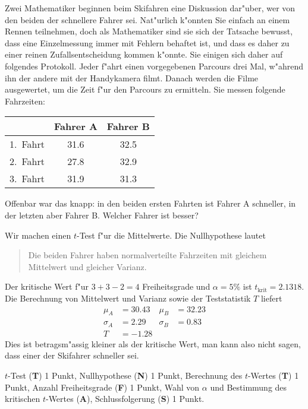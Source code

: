 Zwei Mathematiker beginnen beim Skifahren eine Diskussion dar"uber, 
wer von den beiden der schnellere Fahrer sei.
Nat"urlich k"onnten Sie einfach an einem Rennen teilnehmen, doch
als Mathematiker sind sie sich der Tatsache bewusst, dass eine
Einzelmessung immer mit Fehlern behaftet ist, und dass es daher
zu einer reinen Zufallsentscheidung kommen k"onnte. Sie einigen sich daher
auf folgendes Protokoll. Jeder f"ahrt einen vorgegebenen Parcours
drei Mal, w"ahrend ihn der andere mit der Handykamera filmt.
Danach werden die Filme ausgewertet, um die Zeit f"ur den Parcours
zu ermitteln. Sie messen folgende Fahrzeiten:
\begin{center}
\begin{tabular}{|l|c|c|}
\hline
        &Fahrer A&Fahrer B\\
\hline
1.~Fahrt&  31.6  &  32.5  \\
2.~Fahrt&  27.8  &  32.9  \\
3.~Fahrt&  31.9  &  31.3  \\
\hline
\end{tabular}
\end{center}
Offenbar war das knapp: in den beiden ersten Fahrten ist Fahrer A schneller,
in der letzten aber Fahrer B.
Welcher Fahrer ist besser?

\begin{loesung}
Wir machen einen $t$-Test f"ur die Mittelwerte.
Die Nullhypothese lautet
\begin{quote}
Die beiden Fahrer haben normalverteilte Fahrzeiten mit gleichem
Mittelwert und gleicher Varianz.
\end{quote}
Der kritische Wert f"ur $3+3-2=4$ Freiheitsgrade und $\alpha=5\%$
ist $t_{\text{krit}}=2.1318$.
Die Berechnung von Mittelwert und Varianz sowie der Teststatistik $T$
liefert
\begin{align*}
\mu_A&=30.43
&
\mu_B&=32.23
\\
\sigma_A&=2.29
&
\sigma_B&=0.83
\\
T&=-1.28
\end{align*}
Dies ist betragsm"assig kleiner als der kritische Wert,
man kann also nicht sagen, dass einer der Skifahrer schneller sei.
\end{loesung}

\begin{bewertung}
$t$-Test ({\bf T}) 1 Punkt,
Nullhypothese ({\bf N}) 1 Punkt,
Berechnung des $t$-Wertes ({\bf T}) 1 Punkt,
Anzahl Freiheitsgrade ({\bf F}) 1 Punkt,
Wahl von $\alpha$ und Bestimmung des kritischen $t$-Wertes ({\bf A}),
Schlussfolgerung ({\bf S}) 1 Punkt.
\end{bewertung}

